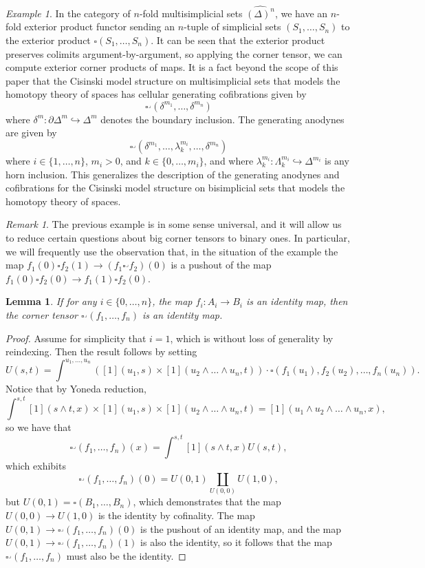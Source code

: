 \documentclass[a4paper]{article}
\numberwithin{equation}{subsection}
\theoremstyle{plain}   %
\newtheorem{lemma}[equation]{Lemma}
\theoremstyle{definition}
\theoremstyle{remark}
\newtheorem{rem}[equation]{Remark}
\newtheorem{example}[equation]{Example}
\theoremstyle{plain}
\newcommand{\psh}[1]{\ensuremath{\widehat{#1}}}
\begin{document}
\begin{example}
	In the category of \(n\)-fold multisimplicial sets \(\psh{(\Delta)^n}\), we have an \(n\)-fold exterior product functor sending an \(n\)-tuple of simplicial sets \((S_1,\dots,S_n)\) to the exterior product \(\square(S_1,\dots,S_n)\).  It can be seen that the exterior product preserves colimits argument-by-argument, so applying the corner tensor, we can compute exterior corner products of maps.  It is a fact beyond the scope of this paper that the Cisinski model structure on multisimplicial sets that models the homotopy theory of spaces has cellular generating cofibrations given by 
	\[
		\square^\lrcorner(\delta^{m_1},\dots, \delta^{m_n})
	\]
	where \(\delta^m:\partial \Delta^m \hookrightarrow \Delta^m\) denotes the boundary inclusion.  The generating anodynes are given by 
	\[
		\square^\lrcorner(\delta^{m_1},\dots,\lambda^{m_i}_k,\dots, \delta^{m_n})
	\]
	where \(i\in \{1,\dots,n\}\), \(m_i >0\), and \(k\in \{0,\dots, m_i\}\), and where \(\lambda^{m_i}_k:\Lambda^{m_i}_k \hookrightarrow \Delta^{m_i}\) is any horn inclusion.  This generalizes the description of the generating anodynes and cofibrations for the Cisinski model structure on bisimplicial sets that models the homotopy theory of spaces.  
\end{example}
\begin{rem}
	The previous example is in some sense universal, and it will allow us to reduce certain questions about big corner tensors to binary ones. In particular, we will frequently use the observation that, in the situation of the example the map \(f_1(0) \square f_2(1) \to (f_1 \square^\lrcorner f_2)(0)\) is a pushout of the map \(f_1(0) \square f_2(0) \to f_1(1) \square f_2(0)\).
\end{rem}
\begin{lemma}\label{corneridentities}
	If for any \(i\in \{0,\dots,n\}\), the map \(f_i:A_i\to B_i\) is an identity map, then the corner tensor \(\square^\lrcorner(f_1,\dots,f_n)\) is an identity map.
\end{lemma}
\begin{proof}
	Assume for simplicity that \(i=1\), which is without loss of generality by reindexing.  Then the result follows by setting 
	\[
		U(s,t)=\int^{u_1,\dots,u_n} \left([1](u_1,s) \times [1](u_2\wedge\dots\wedge u_n,t)\right)\cdot \square(f_1(u_1),f_2(u_2),\dots, f_n(u_n)).
	\]
	Notice that by Yoneda reduction,
	\[
		\int^{s,t} [1](s\wedge t,x) \times [1](u_1,s) \times [1](u_2\wedge\dots\wedge u_n,t) = [1](u_1 \wedge u_2 \wedge \dots\wedge u_n,x),
	\]
	so we have that 
	\[
		\square^\lrcorner(f_1,\dots,f_n)(x)=\int^{s,t} [1](s\wedge t,x) U(s,t),
	\]
	which exhibits 
	\[
		\square^\lrcorner(f_1,\dots,f_n)(0)=U(0,1)\coprod_{U(0,0)} U(1,0),
	\]
	but \(U(0,1)=\square(B_1,\dots,B_n)\), which demonstrates that the map \(U(0,0) \to U(1,0)\) is the identity by cofinality. The map \(U(0,1) \to \square^\lrcorner(f_1,\dots,f_n)(0)\) is the pushout of an identity map, and the map \(U(0,1)\to \square^\lrcorner(f_1,\dots,f_n)(1)\) is also the identity, so it follows that the map \(\square^\lrcorner(f_1,\dots,f_n)\) must also be the identity.
\end{proof}
\end{document}
